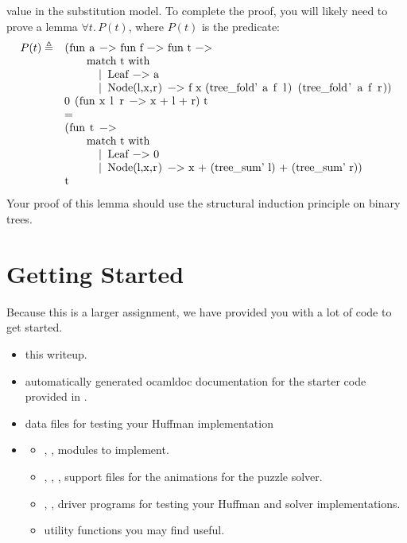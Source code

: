 \documentclass{pset}
\begin{document}
value in the substitution model. To complete the proof, you will
likely need to prove a lemma $\forall t.\,P(t)$, where $P(t)$ is the
predicate:
\[
\begin{array}{ll}
P(t) \triangleq 
& \text{\code{(fun a -> fun f -> fun t ->}}\\
& \qquad\text{\code{match t with}}\\
& \qquad\quad\text{\code{ | Leaf -> a}}\\
& \qquad\quad\text{\code{ | Node(l,x,r) -> f x (tree\_fold' a f l) (tree\_fold' a f r))}}\\
& \text{\code{0 (fun x l r -> x + l + r) t}}\\
& = \\
& \text{\code{(fun t ->}}\\
& \qquad\text{\code{match t with}}\\
& \qquad\quad\text{\code{ | Leaf -> 0}}\\
& \qquad\quad\text{\code{| Node(l,x,r) -> x + (tree\_sum' l) + (tree\_sum' r))}}\\
& \text{\code{t}}\\
\end{array}
\]
Your proof of this lemma should use the structural induction principle
on binary trees.

\newpage{}

\setlength{\parskip}{0.1em}
\section*{Getting Started}

Because this is a larger assignment, we have provided you with a lot of
code to get started. 

\begin{itemize}
\item {} this writeup.
\item {} automatically generated ocamldoc documentation
  for the starter code provided in .
\item {} data files for testing your Huffman implementation
\item {} \begin{itemize}
  \item {}, ,
         modules to implement.
  \item {},
    ,
    ,  support
    files for the animations for the puzzle solver.
  \item {}, ,
      driver programs for
    testing your Huffman and solver implementations.
  \item {} utility functions  you may find useful.
  \end{itemize}
\end{itemize}
\end{document}
